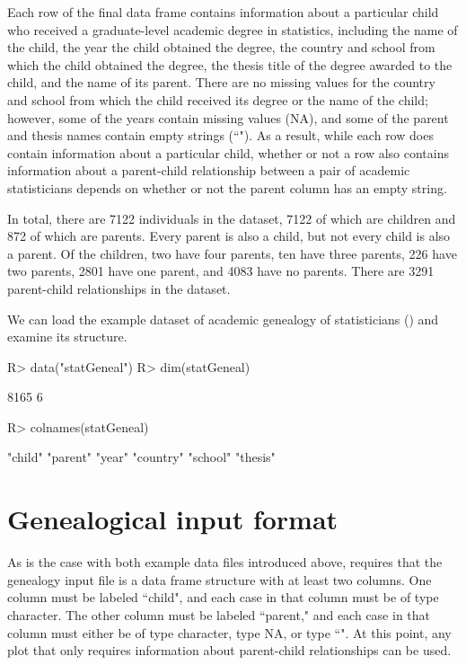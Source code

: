 \documentclass[article,shortnames]{jss}
\begin{document}
Each row of the final data frame contains information about a particular child who received a graduate-level academic degree in statistics, including the name of the child, the year the child obtained the degree, the country and school from which the child obtained the degree, the thesis title of the degree awarded to the child, and the name of its parent. There are no missing values for the country and school from which the child received its degree or the name of the child; however, some of the years contain missing values (NA), and some of the parent and thesis names contain empty strings (``"). As a result, while each row does contain information about a particular child, whether or not a row also contains information about a parent-child relationship between a pair of academic statisticians depends on whether or not the parent column has an empty string.
 
In total, there are 7122 individuals in the dataset, 7122 of which are children and 872 of which are parents. Every parent is also a child, but not every child is also a parent. Of the children, two have four parents, ten have three parents, 226 have two parents, 2801 have one parent, and 4083 have no parents. There are 3291 parent-child relationships in the dataset.

We can load the example dataset of academic genealogy of statisticians () and examine its structure. 

\begin{CodeChunk}
\begin{CodeInput}
R> data("statGeneal")
R> dim(statGeneal)
\end{CodeInput}
\begin{CodeOutput}
[1] 8165    6
\end{CodeOutput}
\begin{CodeInput}
R> colnames(statGeneal)
\end{CodeInput}
\begin{CodeOutput}
[1] "child"   "parent"  "year"    "country" "school"  "thesis"
\end{CodeOutput}
\end{CodeChunk}

\section{Genealogical input format}

As is the case with both example data files introduced above,  requires that the genealogy input file is a data frame structure with at least two columns. One column must be labeled ``child", and each case in that column must be of type character. The other column must be labeled ``parent," and each case in that column must either be of type character, type NA, or type ``". At this point, any  plot that only requires information about parent-child relationships can be used.
\end{document}
